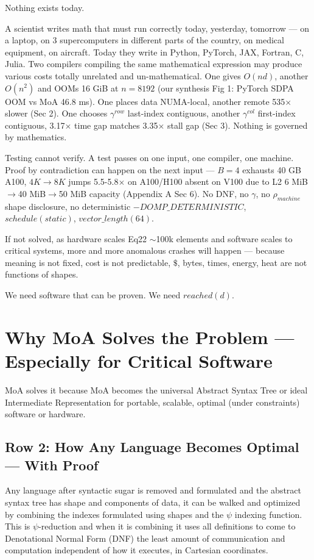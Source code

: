 \documentclass[11pt]{article}
\begin{document}
Nothing exists today.

A scientist writes math that must run correctly today, yesterday, tomorrow — on a laptop, on 3 supercomputers in different parts of the country, on medical equipment, on aircraft. Today they write in Python, PyTorch, JAX, Fortran, C, Julia. Two compilers compiling the same mathematical expression may produce various costs totally unrelated and un-mathematical. One gives $O(nd)$, another $O(n^2)$ and OOMs 16 GiB at $n=8192$ (our synthesis Fig 1: PyTorch SDPA OOM vs MoA 46.8 ms). One places data NUMA-local, another remote 535$\times$ slower (Sec 2). One chooses $\gamma^{row}$ last-index contiguous, another $\gamma^{col}$ first-index contiguous, 3.17$\times$ time gap matches 3.35$\times$ stall gap (Sec 3). Nothing is governed by mathematics.

Testing cannot verify. A test passes on one input, one compiler, one machine. Proof by contradiction can happen on the next input — $B=4$ exhausts 40 GB A100, $4K\rightarrow8K$ jumps 5.5-5.8$\times$ on A100/H100 absent on V100 due to L2 6 MiB$\rightarrow$40 MiB$\rightarrow$50 MiB capacity (Appendix A Sec 6). No DNF, no $\gamma$, no $\rho_{machine}$ shape disclosure, no deterministic $-DOMP\_DETERMINISTIC$, $schedule(static)$, $vector\_length(64)$.

If not solved, as hardware scales Eq22 $\sim$100k elements and software scales to critical systems, more and more anomalous crashes will happen — because meaning is not fixed, cost is not predictable, $\$$, bytes, times, energy, heat are not functions of shapes.

We need software that can be proven. We need $reached(d)$.

\section{Why MoA Solves the Problem — Especially for Critical Software}

MoA solves it because MoA becomes the universal Abstract Syntax Tree or ideal Intermediate Representation for portable, scalable, optimal (under constraints) software or hardware.

\subsection{Row 2: How Any Language Becomes Optimal — With Proof}

Any language after syntactic sugar is removed and formulated and the abstract syntax tree has shape and components of data, it can be walked and optimized by combining the indexes formulated using shapes and the $\psi$ indexing function. This is $\psi$-reduction and when it is combining it uses all definitions to come to Denotational Normal Form (DNF) the least amount of communication and computation independent of how it executes, in Cartesian coordinates.
\end{document}

